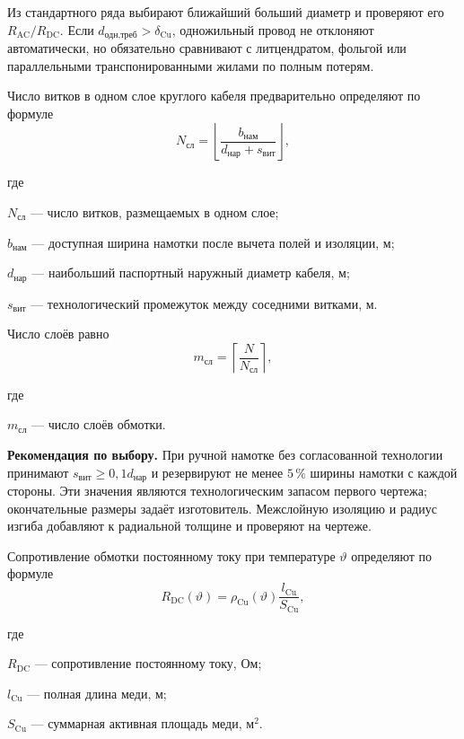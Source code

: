 \documentclass[14pt,a4paper]{extarticle}
\newcommand{\recommend}{\par\noindent\textbf{Рекомендация по выбору.} }
\newenvironment{whereblock}
 {\par\noindent где\par
  \begin{list}{}{\setlength{\leftmargin}{12.5mm}
                  \setlength{\itemindent}{-12.5mm}
                  \setlength{\itemsep}{0pt}
                  \setlength{\parsep}{0pt}
                  \setlength{\topsep}{0pt}}}
 {\end{list}}
\newcommand{\whereitem}[2]{\item[] #1 --- #2}
\begin{document}
Из стандартного ряда выбирают ближайший больший диаметр и проверяют его
$R_{\text{AC}}/R_{\text{DC}}$. Если
$d_{\text{одн,треб}}>\delta_{\text{Cu}}$, одножильный провод не отклоняют
автоматически, но обязательно сравнивают с литцендратом, фольгой или
параллельными транспонированными жилами по полным потерям.

Число витков в одном слое круглого кабеля предварительно определяют по
формуле
\begin{equation}
 N_{\text{сл}}=
 \left\lfloor
 \frac{b_{\text{нам}}}
 {d_{\text{нар}}+s_{\text{вит}}}
 \right\rfloor,
 \label{eq:turns-per-layer}
\end{equation}
\begin{whereblock}
\whereitem{$N_{\text{сл}}$}{число витков, размещаемых в одном слое;}
\whereitem{$b_{\text{нам}}$}{доступная ширина намотки после вычета полей и
изоляции, м;}
\whereitem{$d_{\text{нар}}$}{наибольший паспортный наружный диаметр кабеля,
м;}
\whereitem{$s_{\text{вит}}$}{технологический промежуток между соседними
витками, м.}
\end{whereblock}

Число слоёв равно
\begin{equation}
 m_{\text{сл}}=
 \left\lceil\frac{N}{N_{\text{сл}}}\right\rceil,
 \label{eq:winding-layer-count}
\end{equation}
\begin{whereblock}
\whereitem{$m_{\text{сл}}$}{число слоёв обмотки.}
\end{whereblock}

\recommend При ручной намотке без согласованной технологии принимают
$s_{\text{вит}}\geq0{,}1d_{\text{нар}}$ и резервируют не менее
$5\,\%$ ширины намотки с каждой стороны. Эти значения являются
технологическим запасом первого чертежа; окончательные размеры задаёт
изготовитель. Межслойную изоляцию и радиус изгиба добавляют к радиальной
толщине и проверяют на чертеже.

Сопротивление обмотки постоянному току при температуре $\vartheta$
определяют по формуле
\begin{equation}
 R_{\text{DC}}(\vartheta)=
 \rho_{\text{Cu}}(\vartheta)
 \frac{l_{\text{Cu}}}{S_{\text{Cu}}},
 \label{eq:rdc}
\end{equation}
\begin{whereblock}
\whereitem{$R_{\text{DC}}$}{сопротивление постоянному току, Ом;}
\whereitem{$l_{\text{Cu}}$}{полная длина меди, м;}
\whereitem{$S_{\text{Cu}}$}{суммарная активная площадь меди, м$^2$.}
\end{whereblock}
\end{document}
